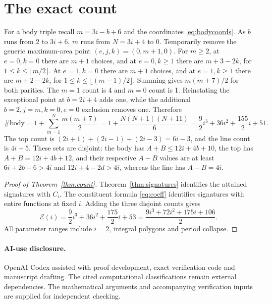 \documentclass[11pt]{article}
\newcommand{\Ehr}{\mathcal E}
\begin{document}
\section{The exact count}\label{sec:count}
For a body triple recall \(m=3i-b+6\) and the coordinates
\eqref{eq:bodycoords}. As \(b\) runs from 2 to \(3i+6\), \(m\) runs from
\(N=3i+4\) to 0. Temporarily remove the generic maximum-area point
\((e,j,k)=(0,m+1,0)\). For \(m\ge2\), at \(e=0,k=0\) there are \(m+1\)
choices, and at \(e=0,k\ge1\) there are \(m+3-2k\), for
\(1\le k\le\lfloor m/2\rfloor\).
At \(e=1,k=0\) there are \(m+1\) choices, and at \(e=1,k\ge1\) there
are \(m+2-2k\), for \(1\le k\le\lfloor(m-1)/2\rfloor\).
Summing gives \(m(m+7)/2\) for both parities.
The \(m=1\) count is 4 and \(m=0\) count is 1.
Reinstating the exceptional point at \(b=2i+4\) adds one, while the
additional \(b=2,j=m,k=0,e=0\) exclusion removes one. Therefore
\[
 \#\text{body}
 =1+\sum_{m=1}^{N}\frac{m(m+7)}2
 =1+\frac{N(N+1)(N+11)}6
 =\frac92i^3+36i^2+\frac{155}{2}i+51.
\]
The top count is
\((2i+1)+(2i-1)+(2i-3)=6i-3\), and the line count is \(4i+5\).
These sets are disjoint: the body has \(A+B\le12i+4b+10\),
the top has \(A+B=12i+4b+12\), and their respective \(A-B\) values
are at least \(6i+2b-6>4i\) and \(12i+4-2d>4i\),
whereas the line has \(A-B=4i\).

\begin{proof}[Proof of Theorem~\ref{thm:count}]
Theorem~\ref{thm:signatures} identifies the attained signatures with \(C_i\).
The constituent formula \eqref{eq:coeff} identifies signatures with entire
functions at fixed \(i\). Adding the three disjoint counts gives
\[
 \Ehr(i)=\frac92i^3+36i^2+\frac{175}{2}i+53
        =\frac{9i^3+72i^2+175i+106}{2}.
\]
All parameter ranges include \(i=2\), integral polygons and period collapse.
\end{proof}

\paragraph{AI-use disclosure.}
OpenAI Codex assisted with proof development, exact verification code and
manuscript drafting. The cited computational classifications remain external
dependencies. The mathematical arguments and accompanying verification inputs
are supplied for independent checking.
\end{document}
